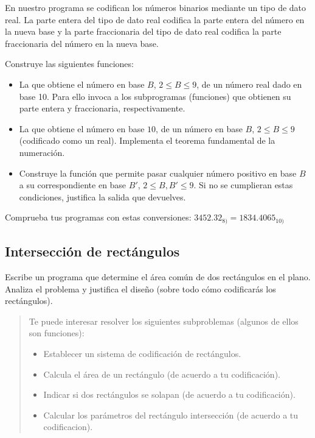 En nuestro programa  se codifican los números binarios mediante un tipo de dato real. La parte entera del tipo de dato real codifica la parte entera del número en la nueva base y la parte fraccionaria del tipo de dato real codifica la parte fraccionaria del número en la nueva base.

Construye las siguientes funciones:
\begin{itemize}
\item La que obtiene el número en base $B$, $2\leq B\leq 9$, de un número real dado en base 10. Para ello invoca a los subprogramas (funciones) que obtienen su parte entera y fraccionaria, respectivamente.

\item La que obtiene el número en base $10$, de un número en base $B$, $2\leq B\leq 9$ (codificado como un real). Implementa el teorema fundamental de la numeración.

\item Construye la función que permite pasar cualquier número positivo en base $B$ a su correspondiente en base $B'$, $2\leq B, B'\leq 9$.
Si no se cumplieran estas condiciones, justifica la salida que devuelves.
\end{itemize}


Comprueba tus programas con estas conversiones: $3452.32_{8)} = 1834.4065_{10)}$







\separacion
\subsection{Intersección de rectángulos}


Escribe un programa que determine el área común de dos rectángulos en el plano. Analiza el problema y justifica el diseño (sobre todo cómo codificarás los rectángulos).

\begin{quote}
Te puede interesar resolver los siguientes subproblemas (algunos de ellos son funciones):
\begin{itemize}
\item Establecer un sistema de codificación de rectángulos.
\item Calcula el área de un rectángulo (de acuerdo a tu codificación).
\item Indicar si dos rectángulos se solapan (de acuerdo a tu codificación).
\item Calcular los parámetros del rectángulo intersección (de acuerdo a tu codificacion).
\end{itemize}
\end{quote}

